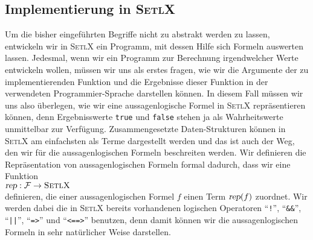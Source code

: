 \subsection{Implementierung in \textsc{SetlX}} 
Um die bisher eingef\"{u}hrten Begriffe nicht zu abstrakt werden zu lassen,
entwickeln wir in \textsc{SetlX} ein Programm, mit dessen Hilfe sich Formeln
auswerten lassen.  
Jedesmal, wenn wir ein Programm zur Berechnung irgendwelcher Werte entwickeln wollen,
m\"{u}ssen wir uns als erstes fragen, wie wir die Argumente der zu implementierenden Funktion und die
Ergebnisse dieser Funktion in der verwendeten Programmier-Sprache darstellen k\"{o}nnen.
In diesem Fall m\"{u}ssen wir uns also \"{u}berlegen, wie wir eine
aussagenlogische Formel in \textsc{SetlX} repr\"{a}sentieren k\"{o}nnen, denn Ergebnisswerte
\texttt{true} und \texttt{false} stehen ja als Wahrheitswerte unmittelbar zur Verf\"{u}gung.
Zusammengesetzte Daten-Strukturen k\"{o}nnen in \textsc{SetlX} am einfachsten als
Terme dargestellt werden und das ist auch der Weg, den wir f\"{u}r die aussagenlogischen
Formeln  beschreiten werden.  Wir definieren die Repr\"{a}sentation von
aussagenlogischen Formeln formal dadurch, dass wir eine Funktion
\\[0.2cm]
\hspace*{1.3cm}
$\textsl{rep}: \mathcal{F} \rightarrow \textsc{SetlX}$
\\[0.2cm]
definieren, die einer aussagenlogischen Formel $f$ einen Term $\textsl{rep}(f)$ zuordnet.  Wir
werden dabei die in \textsc{SetlX} bereits vorhandenen logischen Operatoren
``\texttt{!}'', ``\texttt{\&\&}'', ``\texttt{||}'', ``\texttt{=>}'' und
``\texttt{<==>}'' benutzen, denn damit k\"{o}nnen wir die aussagenlogischen Formeln in sehr nat\"{u}rlicher
Weise darstellen.
